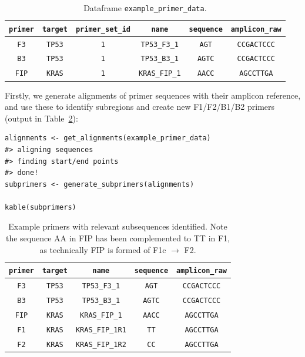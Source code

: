 \documentclass[../thesis.tex]{subfiles}
\begin{document}
\begin{table}[h!]
    \centering
    \begin{tabular}{c|c|c|c|c|c}
         \verb|primer| & \verb|target|  & \verb|primer_set_id| & \verb|name| & \verb|sequence| & \verb|amplicon_raw| \\
         \hline
\verb|F3| &	\verb|TP53|	& \verb|1|  &	\verb|TP53_F3_1|	& \verb|AGT|  &	\verb|CCGACTCCC|	 \\
\verb|B3| &	\verb|TP53| &	\verb|1| & \verb|TP53_B3_1|  &	\verb|AGTC|	& \verb|CCGACTCCC|  \\
\verb|FIP| &	\verb|KRAS| & \verb|1|  &	\verb|KRAS_FIP_1|	& \verb|AACC|  &	\verb|AGCCTTGA|	\\

    \end{tabular}
    \caption{Dataframe \lstinline{example_primer_data}.}
    \label{tab:example_primer_data}
\end{table}

Firstly, we generate alignments of primer sequences with their amplicon
reference, and use these to identify subregions and create new F1/F2/B1/B2 primers (output in Table~\ref{tab:subprimers}):

\begin{lstlisting}
alignments <- get_alignments(example_primer_data)
#> aligning sequences
#> finding start/end points
#> done!
subprimers <- generate_subprimers(alignments)

kable(subprimers) 
\end{lstlisting}

\begin{table}[h!]
    \centering
    \begin{tabular}{c|c|c|c|c}
         \verb|primer| & \verb|target|    & \verb|name| & \verb|sequence| & \verb|amplicon_raw| \\
         \hline
\verb|F3| &	\verb|TP53|	& 	\verb|TP53_F3_1|	& \verb|AGT|  &	\verb|CCGACTCCC|	 \\
\verb|B3| &	\verb|TP53| & \verb|TP53_B3_1|  &	\verb|AGTC|	& \verb|CCGACTCCC|  \\
\verb|FIP| &	\verb|KRAS|  &	\verb|KRAS_FIP_1|	& \verb|AACC|  &	\verb|AGCCTTGA|	\\
\verb|F1| &	\verb|KRAS| & \verb|KRAS_FIP_1R1|  &	\verb|TT|	& \verb|AGCCTTGA|  \\
\verb|F2| &	\verb|KRAS|  &	\verb|KRAS_FIP_1R2|	& \verb|CC|  &	\verb|AGCCTTGA|	\\

    \end{tabular}
    \caption{Example primers with relevant subsequences identified. Note the sequence AA in FIP has been complemented to TT in F1, as technically FIP is formed of F1c $\rightarrow$ F2.}
    \label{tab:subprimers}
\end{table}
\end{document}
